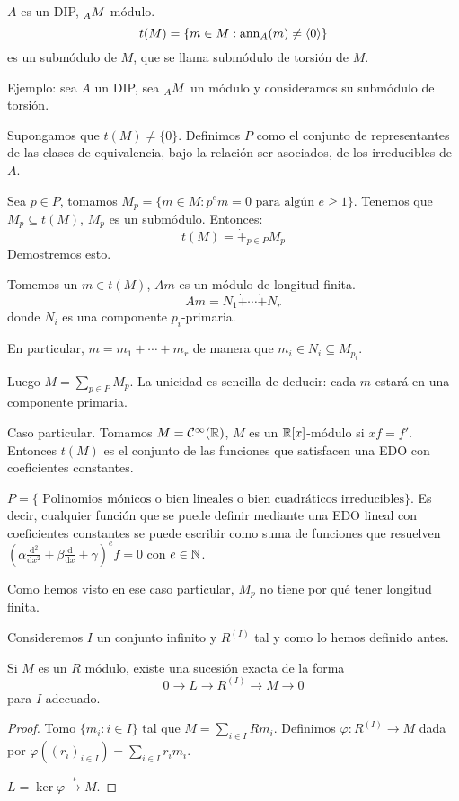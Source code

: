 \begin{df}
\(A\) es un DIP, \(\prescript{}{A}{M}\) módulo.
\[
  t(M)=\{m\in M:\operatorname{ann}_A(m)\neq\langle 0\rangle\}
\]
es un submódulo de \(M\), que se llama submódulo de torsión de \(M\).
\end{df}


Ejemplo: sea \(A\) un DIP,
sea \(\prescript{}{A}{M}\) un módulo y consideramos
su submódulo de torsión.

Supongamos que \(t(M)\neq\{0\}\).
Definimos \(P\) como el conjunto de representantes de las clases de
equivalencia, bajo la relación ser asociados, de los irreducibles de \(A\).

Sea \(p\in P\), tomamos \(M_p=\{m\in M: p^e m=0\textrm{ para algún }
e\ge 1\}\). Tenemos que \(M_p\subseteq t(M)\), \(M_p\) es un submódulo.
Entonces:
\[
  t(M)=\dot{+}_{p\in P} M_p
\]
Demostremos esto.

Tomemos un \(m\in t(M)\), \(Am\) es un módulo de longitud finita.
\[
  Am=N_1\dot{+}\cdots\dot{+}N_r
\] donde \(N_i\) es una componente \(p_i\)-primaria.

En particular, \(m=m_1+\cdots+ m_r\) de manera que \(m_i\in N_i\subseteq
M_{p_i}\).

Luego \(M=\sum_{p\in P} M_p\). La unicidad es sencilla de deducir:
cada \(m\) estará en una componente primaria.

Caso particular. Tomamos \(M=\mathcal{C}^\infty(\mathbb{R})\), \(M\) es un
\(\mathbb{R}[x]\)-módulo si \(xf=f'\). Entonces \(t(M)\) es el conjunto
de las funciones que satisfacen una EDO con coeficientes constantes.

\(P=\{\textrm{ Polinomios mónicos o bien lineales o bien
cuadráticos irreducibles}\}\). Es decir, cualquier función que se puede
definir mediante una EDO lineal con coeficientes constantes se puede
escribir como suma de funciones que resuelven
\({(\alpha\frac{\textrm{d}^2}{\textrm{d}x^2}+
\beta\frac{\textrm{d}}{\textrm{d}x}+\gamma)}^e f=0\) con \(e\in\mathbb{N}\).

Como hemos visto en ese caso particular, \(M_p\) no tiene por qué
tener longitud finita.

Consideremos \(I\) un conjunto infinito y \(R^{(I)}\) tal y como lo hemos
definido antes.
\begin{lema}
  Si \(M\) es un \(R\) módulo, existe una sucesión exacta de la forma
  \[
    0\longrightarrow L\longrightarrow R^{(I)}\longrightarrow M
    \longrightarrow 0
  \]
  para \(I\) adecuado.
\end{lema}
\begin{proof}
  Tomo \(\{m_i:i\in I\}\) tal que \(M=\sum_{i\in I}Rm_i\).
  Definimos \(\varphi:R^{(I)}\longrightarrow M\) dada por
  \(\varphi({(r_i)}_{i\in I})=\sum_{i\in I}r_i m_i\).

  \(L=\ker\varphi\overset{\iota}{\longrightarrow} M\).
\end{proof}

